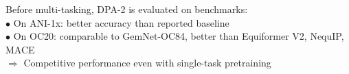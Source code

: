 \documentclass[preview]{standalone}
\begin{document}
\begin{center}
Before multi-tasking, DPA-2 is evaluated on benchmarks: \\
            $\bullet$ On ANI-1x: better accuracy than reported baseline \\
            $\bullet$ On OC20: comparable to GemNet-OC84, better than Equiformer V2, NequIP, MACE \\
            $\Rightarrow$ Competitive performance even with single-task pretraining
\end{center}
\end{document}
